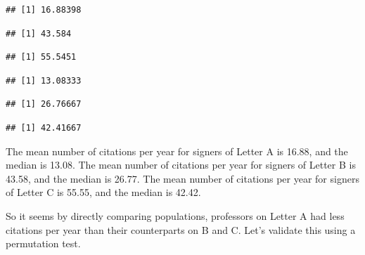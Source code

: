 \documentclass[]{article}
\begin{document}
\begin{verbatim}
## [1] 16.88398
\end{verbatim}

\begin{verbatim}
## [1] 43.584
\end{verbatim}

\begin{verbatim}
## [1] 55.5451
\end{verbatim}

\begin{verbatim}
## [1] 13.08333
\end{verbatim}

\begin{verbatim}
## [1] 26.76667
\end{verbatim}

\begin{verbatim}
## [1] 42.41667
\end{verbatim}

The mean number of citations per year for signers of Letter A is 16.88,
and the median is 13.08. The mean number of citations per year for
signers of Letter B is 43.58, and the median is 26.77. The mean number
of citations per year for signers of Letter C is 55.55, and the median
is 42.42.

So it seems by directly comparing populations, professors on Letter A
had less citations per year than their counterparts on B and C. Let's
validate this using a permutation test.
\end{document}

